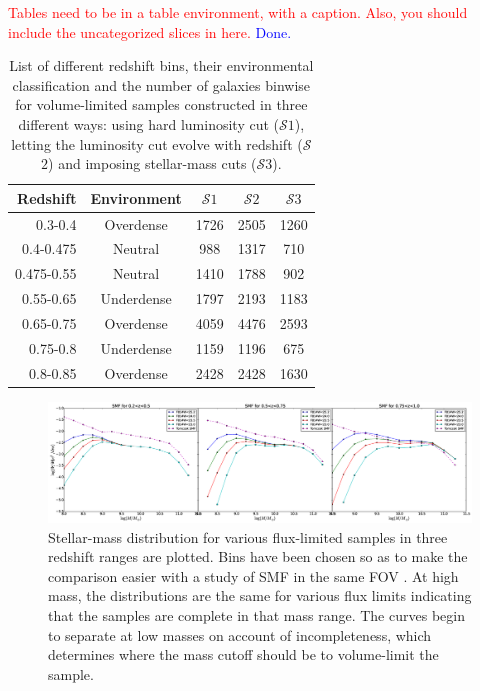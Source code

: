 \documentclass[twocolumn,useAMS,usenatbib]{mn2e}
\newcommand{\rachel}[1]{{\textcolor{red}{#1}}}
\newcommand{\arun}[1]{{\textcolor{blue}{#1}}}
\newcommand{\s}{\ensuremath{\mathcal{S}}}
\begin{document}
\rachel{Tables need to be in a table environment, with a caption.  Also, you should include the uncategorized slices in here.} \arun{Done.}
\begin{table} 
\centering
\begin{tabular}{|r|c|c|c|c|}
 \hline
 Redshift & Environment & \s$1$ & \s$2$ & \s$3$ \\
 \hline
 0.3-0.4 & Overdense & 1726 & 2505 & 1260 \\
 0.4-0.475 & Neutral & 988 & 1317 & 710 \\
 0.475-0.55 & Neutral & 1410 & 1788 & 902 \\
 0.55-0.65 & Underdense & 1797 & 2193 & 1183 \\
 0.65-0.75 & Overdense & 4059 & 4476 & 2593 \\
 0.75-0.8 & Underdense & 1159 & 1196 & 675 \\
 0.8-0.85 & Overdense & 2428 & 2428 & 1630 \\
\end{tabular}
\caption{List of different redshift bins, their environmental classification and the number of galaxies binwise for volume-limited samples constructed in three different ways: using hard luminosity cut (\s$1$), letting the luminosity cut evolve with redshift (\s$2$) and imposing stellar-mass cuts (\s$3$).}
\label{table:GalaxyCounts}
\end{table}

\begin{figure}
 \centering
 \includegraphics[width=2.4\columnwidth]{figure_generated}
 \caption{Stellar-mass distribution for various flux-limited samples in three redshift ranges are plotted. Bins have been chosen so as to make the comparison easier with 
          a study of SMF in the same FOV \citep{Tomczak_SMF}. At high mass, the distributions are the same for various flux limits indicating that the samples are complete in that mass range. The curves begin to separate at low masses on account of incompleteness, which determines where the mass cutoff should be to volume-limit the sample.}
 \label{fig:smf}
\end{figure}
\end{document}
